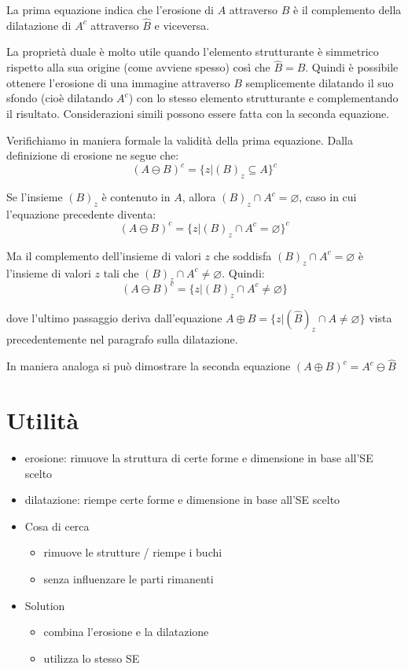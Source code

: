 La prima equazione indica che l'erosione di $A$ attraverso $B$ è il complemento della dilatazione di $A^c$ attraverso $\hat{B}$ e viceversa.

La proprietà duale è molto utile quando l'elemento strutturante è simmetrico rispetto alla sua origine (come avviene spesso) così che $\hat{B} = B$. Quindi è possibile ottenere l'erosione di una immagine attraverso $B$ semplicemente dilatando il suo sfondo (cioè dilatando $A^c$) con lo stesso elemento strutturante e complementando il risultato. Considerazioni simili possono essere fatta con la seconda equazione.

Verifichiamo in maniera formale la validità della prima equazione. Dalla definizione di erosione ne segue che:
$$
(A \ominus B)^c = \{z | (B)_z \subseteq A \}^c 
$$

Se l'insieme $(B)_z$ è contenuto in $A$, allora $(B)_z \cap A^c = \varnothing$, caso in cui l'equazione precedente diventa:
$$
(A \ominus B)^c = \{z | (B)_z \cap A^c = \varnothing \}^c
$$

Ma il complemento dell'insieme di valori $z$ che soddisfa $(B)_z \cap A^c = \varnothing$ è l'insieme di valori $z$ tali che $(B)_z \cap A^c \neq \varnothing$. Quindi:
$$
(A \ominus B)^c = \{z | (B)_z \cap A^c \neq \varnothing \}
$$

dove l'ultimo passaggio deriva dall'equazione $A \oplus B = \{z | (\hat B)_z \cap A \neq \varnothing \}$ vista precedentemente nel paragrafo sulla dilatazione.

In maniera analoga si può dimostrare la seconda equazione $(A \oplus B)^c = A^c \ominus \hat B$

\section{Utilità}
\begin{itemize}
	\item erosione: rimuove la struttura di certe forme e dimensione in base all'SE scelto
	
	\item dilatazione: riempe certe forme e dimensione in base all'SE scelto
	
	\item Cosa di cerca
	\begin{itemize}
		\item rimuove le strutture / riempe i buchi
		\item senza influenzare le parti rimanenti
	\end{itemize}
	
	\item Solution
	\begin{itemize}
		\item combina l'erosione e la dilatazione
		\item utilizza lo stesso SE
	\end{itemize}
\end{itemize}

